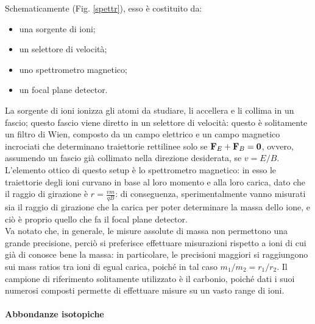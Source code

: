 Schematicamente (Fig. \ref{spettr}), esso è costituito da:
\begin{itemize}
	\item una sorgente di ioni;
	\item un selettore di velocità;
	\item uno spettrometro magnetico;
	\item un focal plane detector.
\end{itemize}
La sorgente di ioni ionizza gli atomi da studiare, li accellera e li collima in un fascio; questo fascio viene diretto in un selettore di velocità: questo è solitamente un filtro di Wien, composto da un campo elettrico e un campo magnetico incrociati che determinano traiettorie rettilinee solo se $ \mathbf{F}_E + \mathbf{F}_B = \mathbf{0} $, ovvero, assumendo un fascio già collimato nella direzione desiderata, se $ v = E / B $.\\
L'elemento ottico di questo setup è lo spettrometro magnetico: in esso le traiettorie degli ioni curvano in base al loro momento e alla loro carica, dato che il raggio di girazione è $ r = \frac{vm}{qB} $: di conseguenza, sperimentalmente vanno misurati sia il raggio di girazione che la carica per poter determinare la massa dello ione, e ciò è proprio quello che fa il focal plane detector.\\
Va notato che, in generale, le misure assolute di massa non permettono una grande precisione, perciò si preferisce effettuare misurazioni rispetto a ioni di cui già di conosce bene la massa: in particolare, le precisioni maggiori si raggiungono sui mass ratios tra ioni di egual carica, poiché in tal caso $ m_1 / m_2 = r_1 / r_2 $. Il campione di riferimento solitamente utilizzato è il carbonio, poiché dati i suoi numerosi composti permette di effettuare misure su un vasto range di ioni.

\paragraph{Abbondanze isotopiche}

